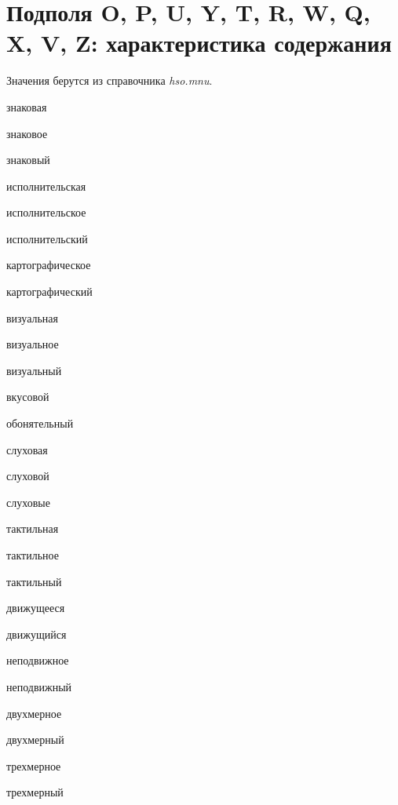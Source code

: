 \section{Подполя O, P, U, Y, T, R, W, Q, X, V, Z: характеристика содержания}

Значения берутся из справочника \emph{hso.mnu}.

\begin{cutelist}
    \item знаковая
    \item знаковое
    \item знаковый
    \item исполнительская
    \item исполнительское
    \item исполнительский
    \item картографическое
    \item картографический
    \item визуальная
    \item визуальное
    \item визуальный
    \item вкусовой
    \item обонятельный
    \item слуховая
    \item слуховой
    \item слуховые
    \item тактильная
    \item тактильное
    \item тактильный
    \item движущееся
    \item движущийся
    \item неподвижное
    \item неподвижный
    \item двухмерное
    \item двухмерный
    \item трехмерное
    \item трехмерный
\end{cutelist}